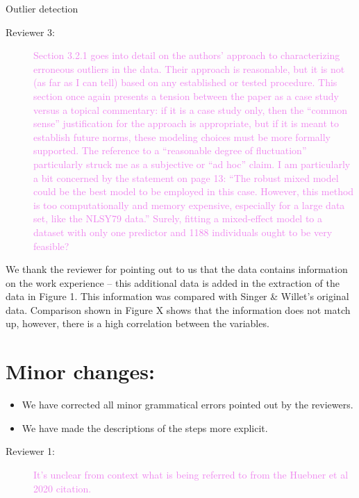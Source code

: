 \documentclass[12pt,a4paper,]{article}
\providecommand{\tightlist}{%
  \setlength{\itemsep}{0pt}\setlength{\parskip}{0pt}}
\begin{document}
Outlier detection

\begin{description}
\item[Reviewer 3:] \textcolor{violet}{
Section 3.2.1 goes into detail on the authors’ approach to characterizing erroneous outliers in
the data. Their approach is reasonable, but it is not (as far as I can tell) based on any
established or tested procedure. This section once again presents a tension between the paper
as a case study versus a topical commentary: if it is a case study only, then the “common sense”
justification for the approach is appropriate, but if it is meant to establish future norms, these
modeling choices must be more formally supported. The reference to a “reasonable degree of
fluctuation” particularly struck me as a subjective or “ad hoc” claim. I am particularly a bit concerned by the statement on page 13: “The robust mixed model could
be the best model to be employed in this case. However, this method is too computationally
and memory expensive, especially for a large data set, like the NLSY79 data.” Surely, fitting a 
mixed-effect model to a dataset with only one predictor and 1188 individuals ought to be very
feasible?
}
\end{description}

We thank the reviewer for pointing out to us that the data contains information on the work experience -- this additional data is added in the extraction of the data in Figure 1. This information was compared with Singer \& Willet's original data. Comparison shown in Figure X shows that the information does not match up, however, there is a high correlation between the variables.

\section*{Minor changes:}

\begin{itemize}
\tightlist
\item
  We have corrected all minor grammatical errors pointed out by the reviewers.\\
\item
  We have made the descriptions of the steps more explicit.
\end{itemize}

\begin{description}
\item[Reviewer 1:]\textcolor{violet}{It's unclear from context what is being referred to from the Huebner et al 2020 citation.}
\end{description}
\end{document}
